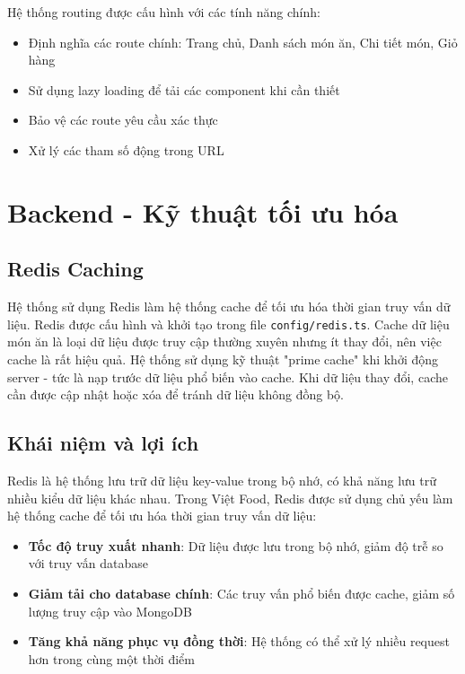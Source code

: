Hệ thống routing được cấu hình với các tính năng chính:
\begin{itemize}
    \item Định nghĩa các route chính: Trang chủ, Danh sách món ăn, Chi tiết món, Giỏ hàng
    \item Sử dụng lazy loading để tải các component khi cần thiết
    \item Bảo vệ các route yêu cầu xác thực
    \item Xử lý các tham số động trong URL
\end{itemize}

\section{Backend - Kỹ thuật tối ưu hóa}

\subsection{Redis Caching}

Hệ thống sử dụng Redis làm hệ thống cache để tối ưu hóa thời gian truy vấn dữ liệu. Redis được cấu hình và khởi tạo trong file \texttt{config/redis.ts}. Cache dữ liệu món ăn là loại dữ liệu được truy cập thường xuyên nhưng ít thay đổi, nên việc cache là rất hiệu quả. Hệ thống sử dụng kỹ thuật "prime cache" khi khởi động server - tức là nạp trước dữ liệu phổ biến vào cache. Khi dữ liệu thay đổi, cache cần được cập nhật hoặc xóa để tránh dữ liệu không đồng bộ.
\subsection{Khái niệm và lợi ích}
Redis là hệ thống lưu trữ dữ liệu key-value trong bộ nhớ, có khả năng lưu trữ nhiều kiểu dữ liệu khác nhau. Trong Việt Food, Redis được sử dụng chủ yếu làm hệ thống cache để tối ưu hóa thời gian truy vấn dữ liệu:

\begin{itemize}
    \item \textbf{Tốc độ truy xuất nhanh}: Dữ liệu được lưu trong bộ nhớ, giảm độ trễ so với truy vấn database
    \item \textbf{Giảm tải cho database chính}: Các truy vấn phổ biến được cache, giảm số lượng truy cập vào MongoDB
    \item \textbf{Tăng khả năng phục vụ đồng thời}: Hệ thống có thể xử lý nhiều request hơn trong cùng một thời điểm
\end{itemize}

